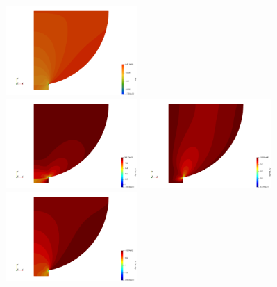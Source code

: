 \begin{center}
\includegraphics[width=5cm]{python_codes/fieldstone_63/results/eyy}\\
\includegraphics[width=5cm]{python_codes/fieldstone_63/results/sigmaxx}
\includegraphics[width=5cm]{python_codes/fieldstone_63/results/sigmaxy}
\includegraphics[width=5cm]{python_codes/fieldstone_63/results/sigmayy}
\end{center}

